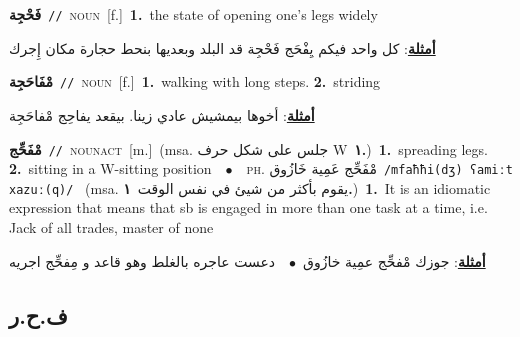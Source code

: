 \documentclass[10pt,a4paper,twoside]{article} %
\begin{document}
\begin{multicols}{2}
{\setlength\topsep{0pt}\textbf{\foreignlanguage{arabic}{فَحْجِة}}\ {\color{gray}\texttt{//}\color{black}}\ \textsc{noun}\ [f.]\ \textbf{1.}~the state of opening one's legs widely\  \begin{flushright}\color{gray}\foreignlanguage{arabic}{\textbf{\underline{\foreignlanguage{arabic}{أمثلة}}}: كل واحد فيكم يِفْحَج فَحْجِة قد البلد وبعديها بنحط حجارة مكان إِجرك}\end{flushright}\color{black}} \vspace{2mm}

{\setlength\topsep{0pt}\textbf{\foreignlanguage{arabic}{مْفَاحَجِة}}\ {\color{gray}\texttt{//}\color{black}}\ \textsc{noun}\ [f.]\ \textbf{1.}~walking with long steps.  \textbf{2.}~striding\  \begin{flushright}\color{gray}\foreignlanguage{arabic}{\textbf{\underline{\foreignlanguage{arabic}{أمثلة}}}: أخوها بيمشيش عادي زينا. بيقعد يفاحِج مْفاحَجِة}\end{flushright}\color{black}} \vspace{2mm}

{\setlength\topsep{0pt}\textbf{\foreignlanguage{arabic}{مْفَحِّج}}\ {\color{gray}\texttt{//}\color{black}}\ \textsc{noun\textunderscore act}\ [m.]\ \color{gray}(msa. \foreignlanguage{arabic}{جلس على شكل حرف} W~\foreignlanguage{arabic}{\textbf{١.}})\color{black}\ \textbf{1.}~spreading legs.  \textbf{2.}~sitting in a W-sitting position\ \ $\bullet$\ \ \textsc{ph.} \color{gray} \foreignlanguage{arabic}{مْفَحِّج عَمِية خَازُوق}\color{black}\ {\color{gray}\texttt{/{\sffamily mfaħħi(dʒ) ʕamiːt xazuː(q)}/}\color{black}}\ \color{gray} (msa. \foreignlanguage{arabic}{يقوم بأكثر من شيئ في نفس الوقت}~\foreignlanguage{arabic}{\textbf{١.}})\color{black}\ \textbf{1.}~It is an idiomatic expression that means that sb is engaged in more than one task at a time, i.e. Jack of all trades, master of none\  \begin{flushright}\color{gray}\foreignlanguage{arabic}{\textbf{\underline{\foreignlanguage{arabic}{أمثلة}}}: جوزك مْفحِّج عمِية خازُوق\ $\bullet$\ \  دعست عاجره بالغلط وهو قاعد و مِفحِّج اجريه}\end{flushright}\color{black}} \vspace{2mm}

\vspace{-3mm}
\subsection*{\color{blue}\foreignlanguage{arabic}{ف.ح.ر}\color{blue}{}} 


\end{multicols}
\end{document}
